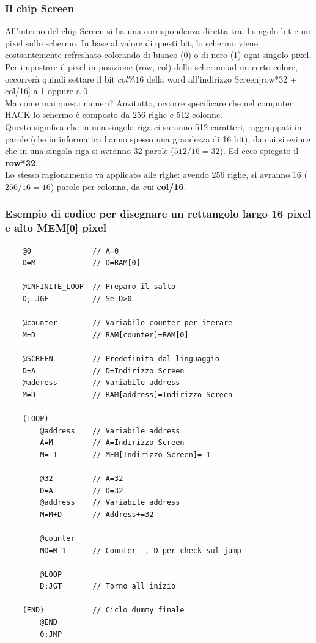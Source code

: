\documentclass[12pt]{article}
\begin{document}
\subsubsection{Il chip Screen}
\label{sssec:screen_chip}
All'interno del chip Screen si ha una corrispondenza diretta tra il singolo bit e un pixel sullo schermo. In base al valore di questi bit, lo schermo viene costsantemente refreshato colorando di bianco (0) o di nero (1) ogni singolo pixel.
\\
Per impostare il pixel in posizione (row, col) dello schermo ad un certo colore, occorrerà quindi settare il bit $col\%16$ della word all'indirizzo Screen[row*32 + col/16] a 1 oppure a 0.
\\
Ma come mai questi numeri? Anzitutto, occorre specificare che nel computer HACK lo schermo è composto da 256 righe e 512 colonne.
\\
Questo significa che in una singola riga ci saranno 512 caratteri, raggruppati in parole (che in informatica hanno spesso una grandezza di 16 bit),
da cui si evince che in una singola riga si avranno 32 parole ($512/16=32$). Ed ecco spiegato il \textbf{row*32}.
\\
Lo stesso ragionamento va applicato alle righe: avendo 256 righe, si avranno 16 ($256/16=16$) parole per colonna, da cui \textbf{col/16}.

\subsubsection{Esempio di codice per disegnare un rettangolo largo 16 pixel e alto MEM[0] pixel}
\label{sssec:rectangle_example}
\begin{lstlisting}
    @0              // A=0
    D=M             // D=RAM[0]

    @INFINITE_LOOP  // Preparo il salto
    D; JGE          // Se D>0

    @counter        // Variabile counter per iterare
    M=D             // RAM[counter]=RAM[0]

    @SCREEN         // Predefinita dal linguaggio
    D=A             // D=Indirizzo Screen
    @address        // Variabile address
    M=D             // RAM[address]=Indirizzo Screen

    (LOOP)
        @address    // Variabile address
        A=M         // A=Indirizzo Screen
        M=-1        // MEM[Indirizzo Screen]=-1
        
        @32         // A=32
        D=A         // D=32
        @address    // Variabile address
        M=M+D       // Address+=32

        @counter
        MD=M-1      // Counter--, D per check sul jump

        @LOOP       
        D;JGT       // Torno all'inizio

    (END)           // Ciclo dummy finale
        @END
        0;JMP
\end{lstlisting}
\end{document}
